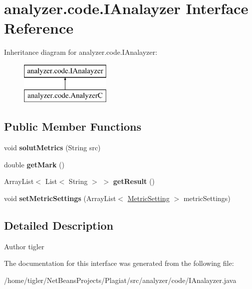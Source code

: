 \hypertarget{interfaceanalyzer_1_1code_1_1IAnalayzer}{}\section{analyzer.\+code.\+I\+Analayzer Interface Reference}
\label{interfaceanalyzer_1_1code_1_1IAnalayzer}
Inheritance diagram for analyzer.\+code.\+I\+Analayzer\+:\begin{figure}[H]
\begin{center}
\leavevmode
\includegraphics[height=2.000000cm]{interfaceanalyzer_1_1code_1_1IAnalayzer}
\end{center}
\end{figure}
\subsection*{Public Member Functions}
\begin{DoxyCompactItemize}
\item 
\mbox{\label{interfaceanalyzer_1_1code_1_1IAnalayzer_a450ba935983e53a70454ab92a0981cc2}} 
void {\bfseries solut\+Metrics} (String src)
\item 
\mbox{\label{interfaceanalyzer_1_1code_1_1IAnalayzer_add27d4f396a1cf411f44dc8cf151f89a}} 
double {\bfseries get\+Mark} ()
\item 
\mbox{\label{interfaceanalyzer_1_1code_1_1IAnalayzer_a3a30c70be99d63443660aa5a6180ef8e}} 
Array\+List$<$ List$<$ String $>$ $>$ {\bfseries get\+Result} ()
\item 
\mbox{\label{interfaceanalyzer_1_1code_1_1IAnalayzer_a2940a978e68d01c8a66d3dcf213b577a}} 
void {\bfseries set\+Metric\+Settings} (Array\+List$<$ \hyperlink{classanalyzer_1_1code_1_1MetricSetting}{Metric\+Setting} $>$ metric\+Settings)
\end{DoxyCompactItemize}


\subsection{Detailed Description}
\begin{DoxyAuthor}{Author}
tigler 
\end{DoxyAuthor}


The documentation for this interface was generated from the following file\+:\begin{DoxyCompactItemize}
\item 
/home/tigler/\+Net\+Beans\+Projects/\+Plagiat/src/analyzer/code/I\+Analayzer.\+java\end{DoxyCompactItemize}
